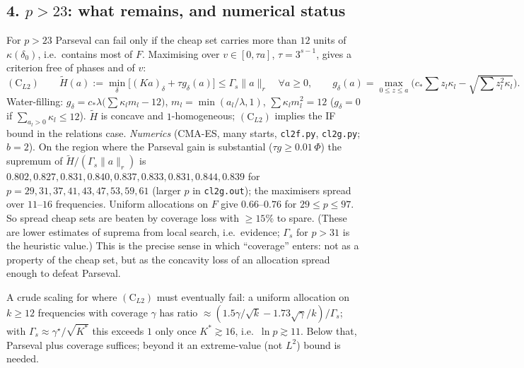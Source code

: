\documentclass[11pt]{article}
\theoremstyle{remark}\newtheorem{remark}[theorem]{Remark}
\begin{document}
\subsection*{4. $p>23$: what remains, and numerical status}
For $p>23$ Parseval can fail only if the cheap set carries more than $12$ units of $\kappa(\delta_0)$, i.e.\ contains most of $F$.
Maximising over $v\in[0,\tau a]$, $\tau=3^{s-1}$, gives a criterion free of phases and of $v$:
\[\textstyle(\mathrm C_{L2})\qquad \widetilde H(a):=\min_\delta\big[(Ka)_\delta+\tau g_\delta(a)\big]\le\Gamma_s\|a\|_r\quad\forall a\ge0,\qquad
g_\delta(a)=\max_{0\le z\le a}\big(c_*\sum z_l\kappa_l-\sqrt{\sum z_l^2\kappa_l}\big).\]
Water-filling: $g_\delta=c_*\lambda\big(\sum\kappa_lm_l-12\big)$, $m_l=\min(a_l/\lambda,1)$, $\sum\kappa_lm_l^2=12$ ($g_\delta=0$ if $\sum_{a_l>0}\kappa_l\le12$).
$\widetilde H$ is concave and $1$-homogeneous; $(\mathrm C_{L2})$ implies the IF bound in the relations case.
\emph{Numerics} (CMA-ES, many starts, \texttt{cl2f.py}, \texttt{cl2g.py}; $b=2$).  On the region where the Parseval gain is
substantial ($\tau g\ge0.01\,\Phi$) the supremum of $\widetilde H/(\Gamma_s\|a\|_r)$ is $0.802,0.827,0.831,0.840,0.837,0.833,0.831,0.844,0.839$
for $p=29,31,37,41,43,47,53,59,61$ (larger $p$ in \texttt{cl2g.out}); the maximisers spread over $11$--$16$ frequencies.  Uniform allocations
on $F$ give $0.66$--$0.76$ for $29\le p\le97$.  So spread cheap sets are beaten by coverage loss with $\ge15\%$ to spare.  (These are
lower estimates of suprema from local search, i.e.\ evidence; $\Gamma_s$ for $p>31$ is the heuristic value.)  This is the precise sense in which ``coverage''
enters: not as a property of the cheap set, but as the concavity loss of an allocation spread enough to defeat Parseval.

A crude scaling for where $(\mathrm C_{L2})$ must eventually fail: a uniform allocation on $k\ge12$ frequencies with coverage $\gamma$ has
ratio $\approx(1.5\gamma/\sqrt k-1.73\sqrt\gamma/k)/\Gamma_s$; with $\Gamma_s\approx\gamma^\star/\sqrt{K^*}$ this exceeds $1$ only once $K^*\gtrsim16$,
i.e.\ $\ln p\gtrsim11$.  Below that, Parseval plus coverage suffices; beyond it an extreme-value (not $L^2$) bound is needed.
\end{document}
